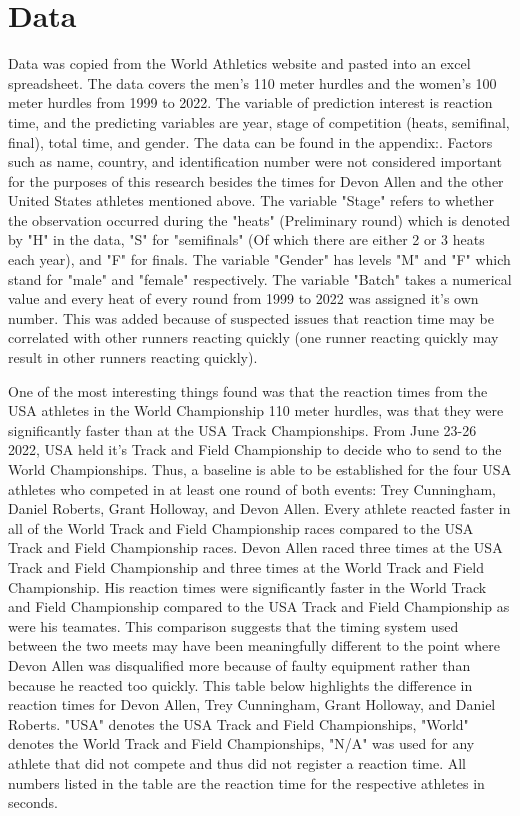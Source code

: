 \documentclass[12pt, letterpaper, titlepage]{article}
\begin{document}
\section{Data}
\label{sec:data}
Data was copied from the World Athletics website and pasted into an excel
spreadsheet. The data covers the men's 110 meter hurdles and the women's 100
meter hurdles from 1999 to 2022.  The variable of prediction interest is reaction
time, and the predicting variables are year, stage of competition (heats, 
semifinal, final), total time, and gender.  The data can be found in the appendix:.  
Factors such as name, country, and identification number were
not considered important for the purposes of this research besides the times for
Devon Allen and the other United States athletes mentioned above.  The variable "Stage"
refers to whether the observation occurred during the "heats" (Preliminary round) which
is denoted by "H" in the data, "S" for "semifinals" (Of which there are either 2 or 3 heats each year), and "F" for finals. The variable "Gender" has levels "M" and "F" which
stand for "male" and "female" respectively.  The variable "Batch" takes a numerical value and every heat of every round from 1999 to 2022 was assigned it's own number.  This
was added because of suspected issues that reaction time may be correlated with other runners reacting quickly (one runner reacting quickly may result in other runners reacting quickly).

One of the most interesting things found was that the reaction times from the USA
athletes in the World Championship 110 meter hurdles, was that they were significantly
faster than at the USA Track Championships.  From June 23-26 2022, USA held it's Track
and Field Championship to decide who to send to the World Championships.  Thus, a baseline
is able to be established for the four USA athletes who competed in at least one round
of both events: Trey Cunningham, Daniel Roberts, Grant Holloway, and Devon Allen. Every
athlete reacted faster in all of the World Track and Field Championship races compared
to the USA Track and Field Championship races. Devon Allen raced three times at
the USA Track and Field Championship and three times at the World Track and Field 
Championship.  His reaction times were significantly faster in the World Track and
Field Championship compared to the USA Track and Field Championship as were his
teamates.  This comparison suggests that the timing system used between the two
meets may have been meaningfully different to the point where Devon Allen was
disqualified more because of faulty equipment rather than because he reacted
too quickly.  This table below highlights the difference in reaction times for
Devon Allen, Trey Cunningham, Grant Holloway, and Daniel Roberts. "USA" denotes
the USA Track and Field Championships, "World" denotes the World Track and Field
Championships, "N/A" was used for any athlete that did not compete and thus
did not register a reaction time.  All numbers listed in the table are the reaction
time for the respective athletes in seconds.
\end{document}
